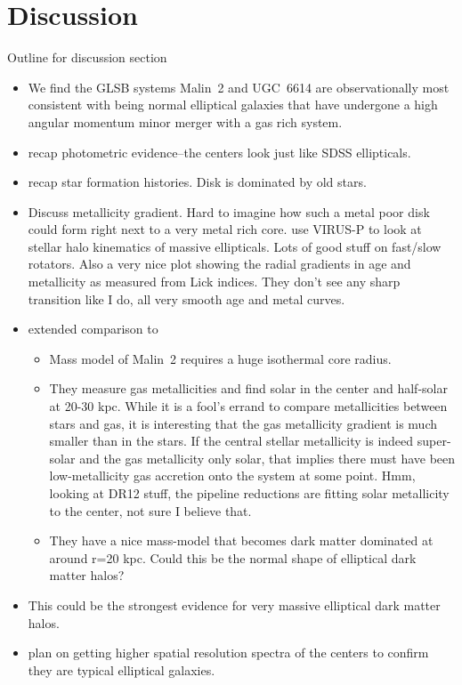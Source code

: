 \documentclass{emulateapj}
\begin{document}
\section{Discussion}

Outline for discussion section
\begin{itemize}
\item{We find the GLSB systems Malin~2 and UGC~6614 are observationally most consistent with being normal elliptical galaxies that have undergone a high angular momentum minor merger with a gas rich system.}
\item{recap photometric evidence--the centers look just like SDSS ellipticals.}
\item{recap star formation histories. Disk is dominated by old stars.}
\item{Discuss metallicity gradient. Hard to imagine how such a metal poor disk could form right next to a very metal rich core.
      \citet{Raskutti14} use VIRUS-P to look at stellar halo kinematics of massive ellipticals.  Lots of good stuff on fast/slow rotators.  Also a very nice plot showing the radial gradients in age and metallicity as measured from Lick indices.  They don't see any sharp transition like I do, all very smooth age and metal curves. }
\item{extended comparison to \citet{Kasparova14}}
  \begin{itemize}
    \item{Mass model of Malin~2 requires a huge isothermal core radius.}
    \item{They measure gas metallicities and find solar in the center and half-solar at 20-30 kpc.  While it is a fool's errand to compare metallicities between stars and gas, it is interesting that the gas metallicity gradient is much smaller than in the stars.  If the central stellar metallicity is indeed super-solar and the gas metallicity only solar, that implies there must have been low-metallicity gas accretion onto the system at some point.  Hmm, looking at DR12 stuff, the pipeline reductions are fitting solar metallicity to the center, not sure I believe that.  }
      \item{They have a nice mass-model that becomes dark matter dominated at around r=20 kpc.  Could this be the normal shape of elliptical dark matter halos?}
  \end{itemize}
  
\item{This could be the strongest evidence for very massive elliptical dark matter halos. }
  \item{plan on getting higher spatial resolution spectra of the centers to confirm they are typical elliptical galaxies.}
\end{itemize}
\end{document}
